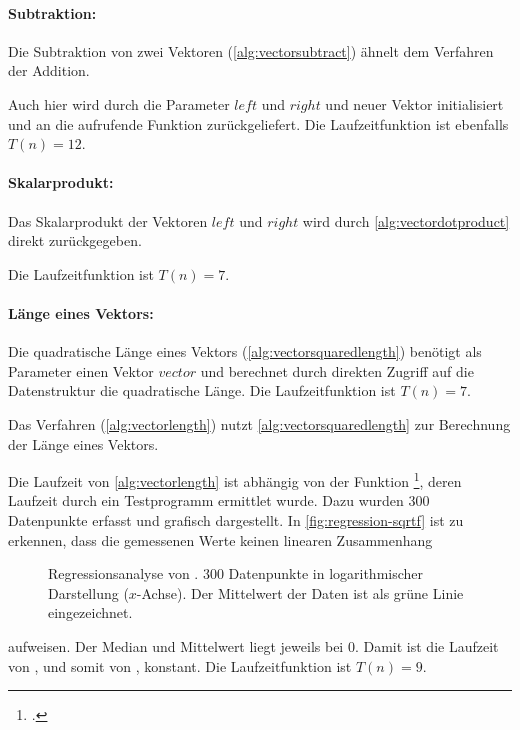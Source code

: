 \paragraph{Subtraktion:} %
\label{par:subtraktion}

Die Subtraktion von zwei Vektoren (\autoref{alg:vectorsubtract}) ähnelt dem Verfahren der Addition.

Auch hier wird durch die Parameter $\mathit{left}$ und $\mathit{right}$ und neuer Vektor initialisiert und an die
 aufrufende Funktion zurückgeliefert. Die Laufzeitfunktion ist ebenfalls $T(n) = 12$.


\paragraph{Skalarprodukt:} %
\label{par:skalarprodukt}

Das Skalarprodukt der Vektoren $\mathit{left}$ und $\mathit{right}$ wird durch \autoref{alg:vectordotproduct} direkt
 zurückgegeben.

Die Laufzeitfunktion ist $T(n) = 7$.


\paragraph{Länge eines Vektors:} %
\label{par:länge_eines_vektors}

Die quadratische Länge eines Vektors (\autoref{alg:vectorsquaredlength}) benötigt als Parameter einen Vektor
 $\mathit{vector}$ und berechnet durch direkten Zugriff auf die Datenstruktur die quadratische Länge. Die
 Laufzeitfunktion ist $T(n) = 7$.

Das Verfahren  (\autoref{alg:vectorlength}) nutzt \autoref{alg:vectorsquaredlength} zur Berechnung der
 Länge eines Vektors.

Die Laufzeit von \autoref{alg:vectorlength} ist abhängig von der Funktion \footcite[Vgl.][]{sqrtf},
 deren Laufzeit durch ein Testprogramm ermittlet wurde. Dazu wurden $300$ Datenpunkte erfasst und grafisch dargestellt.
 In \autoref{fig:regression-sqrtf} ist zu erkennen, dass die gemessenen Werte keinen linearen Zusammenhang
\begin{figure}[!ht]
	\centering
	
	\caption{Regressionsanalyse von . $300$ Datenpunkte in logarithmischer Darstellung ($x$-Achse). Der
	 Mittelwert der Daten ist als grüne Linie eingezeichnet.}
	\label{fig:regression-sqrtf}
\end{figure}
 aufweisen. Der Median und Mittelwert liegt jeweils bei $0$. Damit ist die Laufzeit von , und somit von
 , konstant. Die Laufzeitfunktion ist $T(n) = 9$.


